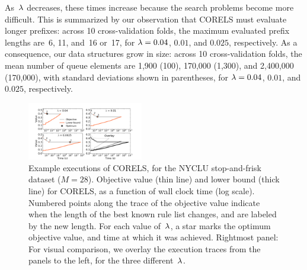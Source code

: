As~${\lambda}$ decreases, these times increase because the search problems become more difficult.
%
This is summarized by our observation that CORELS must evaluate longer prefixes:
across 10 cross-validation folds, the maximum evaluated prefix lengths are~6,
11, and~16 or~17, for ${{\lambda} = 0.04}$, $0.01$, and $0.025$, respectively.
%
As a consequence, our data structures grow in size: \eg
across 10 cross-validation folds, the mean number of queue elements are
1,900 (100), 170,000 (1,300), and 2,400,000 (170,000),
with standard deviations shown in parentheses,
for ${{\lambda} = 0.04}$, $0.01$, and $0.025$, respectively.

\begin{figure}[t!]
\begin{center}
\includegraphics[trim={25mm 10mm 35mm 30mm},
width=0.45\textwidth]{figs/weapon_reg_small-execution.pdf}
\end{center}
\caption{Example executions of CORELS, for the NYCLU stop-and-frisk dataset ($M = 28$).
%
Objective value (thin line) and lower bound (thick line) for CORELS,
as a function of wall clock time (log scale).
%
Numbered points along the trace of the objective value
indicate when the length of the best known rule list changes,
and are labeled by the new length.
%
For each value of~${\lambda}$, a star marks the optimum objective value,
and time at which it was achieved.
%
Rightmost panel: For visual comparison, we overlay the execution traces
from the panels to the left, for the three different~${\lambda}$.
}
\label{fig:weapon-reg-execution}
\end{figure}

